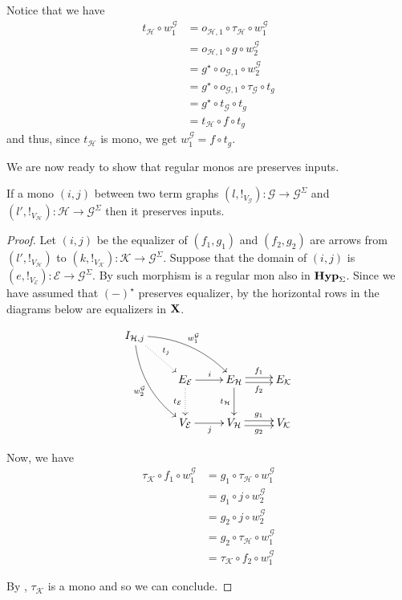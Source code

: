 \documentclass[runningheads,envcountsect]{llncs}
\def\X{\textbf {\textup{X}}}
\newcommand{\catname}[1]{\textbf{\textup{#1}}}
\newcommand{\hyp}{\catname{Hyp}}
\begin{document}
\begin{remark}\label{prop:image}
	Notice that we have
	\begin{align*}
		t_{\mathcal{H}}\circ w^{\mathcal{G}}_1&=o_{\mathcal{H},1}\circ \tau_{\mathcal{H}}\circ w^{\mathcal{G}}_1\\&=o_{\mathcal{H},1}\circ g\circ w^{\mathcal{G}}_2\\&=g^\star\circ o_{\mathcal{G},1}\circ w^{\mathcal{G}}_2\\&=g^\star \circ o_{\mathcal{G},1}\circ \tau_{\mathcal{G}}\circ t_g\\&=g^\star \circ t_{\mathcal{G}}\circ t_g\\&=t_{\mathcal{H}}\circ f\circ t_g
	\end{align*}
	and thus, since $t_{\mathcal{H}}$ is mono, we get $w^{\mathcal{G}}_1=f\circ t_g$.
\end{remark}
We are now ready to show that regular monos are preserves inputs.

\begin{lemma}\label{lem:reg} If a mono $(i,j)$ between two term graphs  $(l, !_{V_{\mathcal{G}}})\colon \mathcal{G}\to \mathcal{G}^{\Sigma}$ and  $(l', !_{V_{\mathcal{H}}})\colon \mathcal{H}\to \mathcal{G}^{\Sigma}$ then it preserves inputs.
\end{lemma}

\begin{proof}
	Let $(i,j)$ be the equalizer of $(f_1, g_1)$ and $(f_2, g_2)$ are arrows from $(l', !_{V_\mathcal{H}})$ to $(k, !_{V_\mathcal{K}})\colon \mathcal{K}\to \mathcal{G}^\Sigma$. Suppose that the domain of $(i,j)$ is  $(e, !_{V_{\mathcal{E}}})\colon \mathcal{E}\to \mathcal{{G}}^\Sigma$.
	By  such morphism is a regular mon also in $\hyp_\Sigma$. Since we have assumed that $(-)^\star$ preserves equalizer, by  the  horizontal rows in the diagrams below are equalizers in $\X$.
	
	\[\xymatrix{I_{\mathcal{H}, j} \ar@/^.4cm/[drr]^{w^{\mathcal{G}}_1}  \ar@/_.4cm/[ddr]_{w^{\mathcal{G}}_2} \ar@{.>}[dr]^{t_j}\\&E_{\mathcal{E}} \ar@{.>}[d]_{t_{\mathcal{E}}} \ar[r]^{i}& E_{\mathcal{H}} \ar[d]_{t_{\mathcal{H}}}  \ar@<.5ex>[r]^{f_1} \ar@<-.5ex>[r]_{f_2} & E_{\mathcal{K}}  \\ &V_{\mathcal{E}} \ar[r]_{j}& V_{\mathcal{H}}  \ar@<.5ex>[r]^{g_1} \ar@<-.5ex>[r]_{g_2}& V_{\mathcal{K}}}\]
	
	Now, we have
	\begin{align*}
		\tau_{\mathcal{K}}\circ f_1\circ w^{\mathcal{G}}_1&=g_1\circ \tau_\mathcal{H}\circ w^{\mathcal{G}}_1\\&=g_1\circ j\circ w^{\mathcal{G}}_2\\&=g_2\circ j\circ w^{\mathcal{G}}_2\\&=g_2\circ \tau_{\mathcal{H}}\circ w^{\mathcal{G}}_1\\&=\tau_{\mathcal{K}}\circ f_2\circ w^{\mathcal{G}}_1
	\end{align*}
	
	By , $\tau_{\mathcal{K}}$ is a mono and so we can conclude.
\end{proof}
\end{document}
